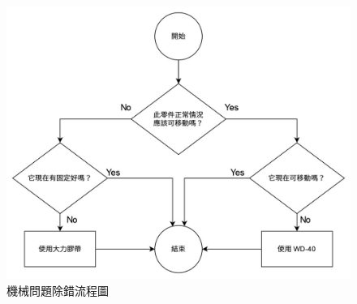 \begin{figure}[!htbp]
\centering

\includegraphics[width=.85\columnwidth]{images/debug.jpg}
\caption{機械問題除錯流程圖}
\label{i:debug}

\end{figure}
